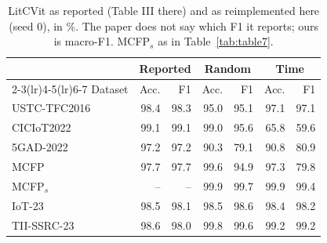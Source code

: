 \begin{table}[t]
\centering
\caption{LitCVit as reported (Table III there) and as reimplemented here (seed 0), in \%. The paper does not say which F1 it reports; ours is macro-F1. MCFP$_{s}$ as in Table~\ref{tab:table7}.}
\label{tab:litcvit}
\setlength{\tabcolsep}{4pt}
\begin{tabular}{lrrrrrr}
\toprule
 & \multicolumn{2}{c}{Reported} & \multicolumn{2}{c}{Random} & \multicolumn{2}{c}{Time} \\
\cmidrule(lr){2-3}\cmidrule(lr){4-5}\cmidrule(lr){6-7}
Dataset & Acc. & F1 & Acc. & F1 & Acc. & F1 \\
\midrule
USTC-TFC2016 & 98.4 & 98.3 & 95.0 & 95.1 & 97.1 & 97.1 \\
CICIoT2022 & 99.1 & 99.1 & 99.0 & 95.6 & 65.8 & 59.6 \\
5GAD-2022 & 97.2 & 97.2 & 90.3 & 79.1 & 90.8 & 80.9 \\
MCFP & 97.7 & 97.7 & 99.6 & 94.9 & 97.3 & 79.8 \\
MCFP$_{s}$ & -- & -- & 99.9 & 99.7 & 99.9 & 99.4 \\
IoT-23 & 98.5 & 98.1 & 98.5 & 98.6 & 98.4 & 98.2 \\
TII-SSRC-23 & 98.6 & 98.0 & 99.8 & 99.6 & 99.2 & 99.2 \\
\bottomrule
\end{tabular}
\end{table}
